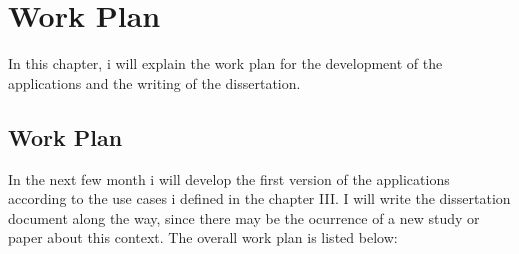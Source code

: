 \chapter{Work Plan}%
\label{chapter:workPlan}

\begin{introduction}
In this chapter, i will explain the work plan for the development of the applications and the writing of the dissertation.
\end{introduction} 


\section{Work Plan}

In the next few month i will develop the first version of the applications according to the use cases i defined in the chapter III. 
I will write the dissertation document along the way, since there may be the ocurrence of a new study or paper about this context.
The overall work plan is listed below:  

